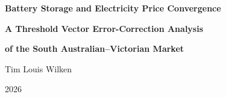 \documentclass[12pt,a4paper]{article}
\begin{document}
\begin{titlepage}
  \centering
  \vspace*{3.0cm}
  {\LARGE\bfseries Battery Storage and Electricity Price Convergence\par}
  \vspace{0.6cm}
  {\Large\bfseries A Threshold Vector Error-Correction Analysis\par}
  {\Large\bfseries of the South Australian--Victorian Market\par}
  \vspace{2.5cm}
  {\large Tim Louis Wilken\par}
  \vspace{0.4cm}
  {\large 2026\par}
  \vfill
\end{titlepage}
\end{document}
